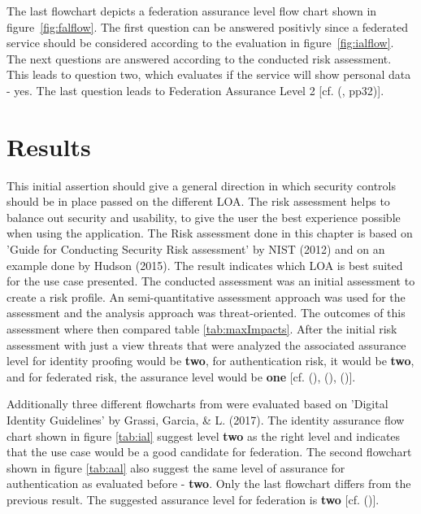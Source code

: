 The last flowchart depicts a federation assurance level flow chart shown in figure~\ref{fig:falflow}. The first question can be answered positivly since a federated service should be considered according to the evaluation in figure~\ref{fig:ialflow}. The next questions are answered according to the conducted risk assessment. This leads to question two, which evaluates if the service will show personal data - yes. The last question leads to Federation Assurance Level 2 [cf. (\cite{NIST:2017:DIG}, pp32)]. 

\pagebreak[4]
\section{Results}
\label{resultSummary}

This initial assertion should give a general direction in which security controls should be in place passed on the different LOA. The risk assessment helps to balance out security and usability, to give the user the best experience possible when using the application. The Risk assessment done in this chapter is based on 'Guide for Conducting Security Risk assessment' by NIST (2012) and on an example done by Hudson (2015). The result indicates which LOA is best suited for the use case presented. The conducted assessment was an initial assessment to create a risk profile. An semi-quantitative assessment approach was used for the assessment and the analysis approach was threat-oriented. The outcomes of this assessment where then compared table \ref{tab:maxImpacts}. After the initial risk assessment with just a view threats that were analyzed the associated assurance level for identity proofing would be \textbf{two}, for authentication risk, it would be \textbf{two}, and for federated risk, the assurance level would be \textbf{one} [cf. (\cite{NIST:2017:DIG}), (\cite{NIST:2018:RMF}), (\cite{Hudson:2015:SecurityRisk})].

Additionally three different flowcharts from were evaluated based on 'Digital Identity Guidelines' by Grassi, Garcia, \& L. (2017). The identity assurance flow chart shown in figure \ref{tab:ial} suggest level \textbf{two} as the right level and indicates that the use case would be a good candidate for federation. The second flowchart shown in figure \ref{tab:aal} also suggest the same level of assurance for authentication as evaluated before - \textbf{two}. Only the last flowchart differs from the previous result. The suggested assurance level for federation is \textbf{two} [cf. (\cite{NIST:2017:DIG})]. 
 
\chapterend
